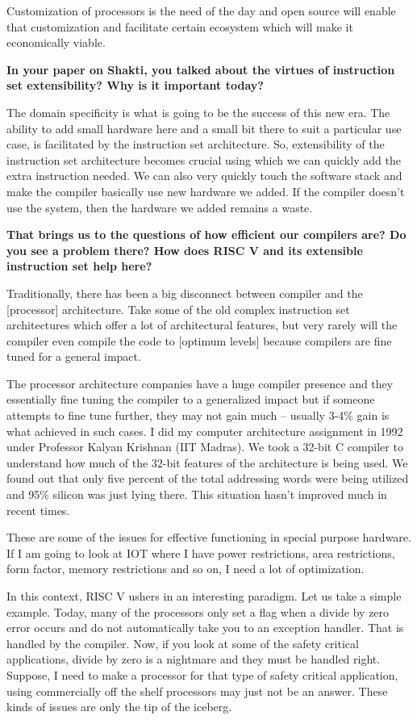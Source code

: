 \begin{multicols}{2}
Customization of processors is the need of the day and open source will enable that customization and facilitate certain ecosystem which will make it economically viable.

{\bf In your paper on Shakti, you talked about the virtues of instruction set extensibility? Why is it important today?}

The domain specificity is what is going to be the success of this new era. The ability to add small hardware here and a small bit there to suit a particular use case, is facilitated by the instruction set architecture. So, extensibility of the instruction set architecture becomes crucial using which we can quickly add the extra instruction needed. We can also very quickly touch the software stack and make the compiler basically use new hardware we added. If the compiler doesn't use the system, then the hardware we added remains a waste.

{\bf That brings us to the questions of how efficient our compilers are? Do you see a problem there? How does RISC V and its extensible instruction set help here?}


Traditionally, there has been a big disconnect between compiler and the [processor] architecture. Take some of the old complex instruction set architectures which offer a lot of architectural features, but very rarely will the compiler even compile the code to [optimum levels] because compilers are fine tuned for a general impact.

The processor architecture companies have a huge compiler presence and they essentially fine tuning the compiler to a generalized impact but if someone attempts to fine tune further, they may not gain much -- usually 3-4\% gain is what achieved in such cases. I did my computer architecture assignment in 1992 under Professor Kalyan Krishnan (IIT Madras). We took a 32-bit C compiler to understand how much of the 32-bit features of the architecture is being used. We found out that only five percent of the total addressing words were being utilized and 95\% silicon was just lying there. This situation hasn't improved much in recent times.

These are some of the issues for effective functioning in special purpose hardware. If I am going to look at IOT where I have power restrictions, area restrictions, form factor, memory restrictions and so on, I need a lot of optimization.

In this context, RISC V ushers in an interesting paradigm. Let us take a simple example.  Today, many of the processors only set a flag when a divide by zero error occurs and do not automatically take you to an exception handler. That is handled by the compiler. Now, if you look at some of the safety critical applications, divide by zero is a nightmare and they must be handled right. Suppose, I need to make a processor for that type of safety critical application, using commercially off the shelf processors may just not be an answer. These kinds of issues are only the tip of the iceberg.


\end{multicols}
